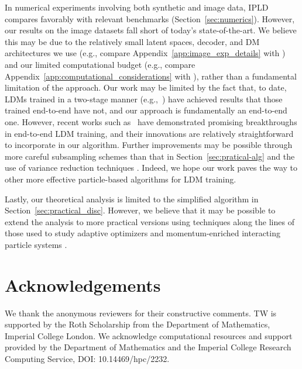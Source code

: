\documentclass[twoside]{article}
\begin{document}
In numerical experiments involving both synthetic and image data, \gls*{IPLD} compares favorably with relevant benchmarks (Section~\ref{sec:numerics}). However, our results on the image datasets fall short of today's state-of-the-art. We believe this may be due to the relatively small latent spaces, decoder, and DM architectures we use (e.g., compare Appendix~\ref{app:image_exp_details} with \citet[Appendices~G.1,2]{vahdatscorebasedgenerativemodeling2021})
and our limited computational budget (e.g., compare Appendix~\ref{app:computational_considerations} with \citet[Appendix E]{rombachhighresolutionimagesynthesis2022}), rather than a fundamental limitation of the approach.
Our work may be limited by the fact that, to date, \glspl*{LDM} trained in a two-stage manner (e.g.,~\cite{rombachhighresolutionimagesynthesis2022}) have achieved results that those trained end-to-end have not, and our approach is fundamentally an end-to-end one. However, recent works such as~\cite{leng2025repaeunlockingvaeendtoend} have demonstrated promising breakthroughs in end-to-end \gls*{LDM} training, and their innovations are relatively straightforward to incorporate in our algorithm. Further improvements may be possible through more careful subsampling schemes than that in Section~\ref{sec:pratical-alg} and the use of variance reduction techniques \citep{zou2018subsampled}. Indeed, we hope our work paves the way to other more effective particle-based algorithms for \gls*{LDM} training.

Lastly, our theoretical analysis is limited to the simplified algorithm in Section~\ref{sec:practical_disc}. However, we believe that it may be possible to extend the analysis to more practical versions using techniques along the lines of those used to study adaptive optimizers \citep{malladi2024sdesscalingrulesadaptive} and momentum-enriched interacting particle systems \citep{oliva2024kineticinteractingparticlelangevin,limMomentumParticleMaximum2024}.
\section*{Acknowledgements}
We thank the anonymous reviewers for their constructive comments. TW is supported by the Roth
Scholarship from the Department of Mathematics, Imperial College London. We acknowledge computational resources and support provided by the Department of Mathematics and the Imperial College Research Computing Service, DOI: 10.14469/hpc/2232.




\appendix
\thispagestyle{empty}

\end{document}
